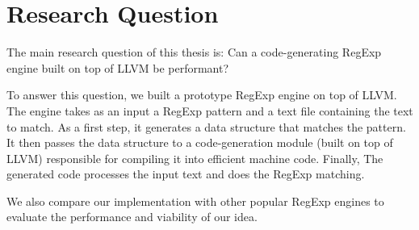 \section{Research Question}\label{researchq}

The main research question of this thesis is: Can a code-generating RegExp engine built on top of LLVM be performant?

To answer this question, we built a prototype RegExp engine on top of LLVM. The engine takes as an input a RegExp pattern and a text file containing the text to match. As a first step, it generates a data structure that matches the pattern. It then passes the data structure to a code-generation module (built on top of LLVM) responsible for compiling it into efficient machine code. Finally, The generated code processes the input text and does the RegExp matching.

We also compare our implementation with other popular RegExp engines to evaluate the performance and viability of our idea. 
